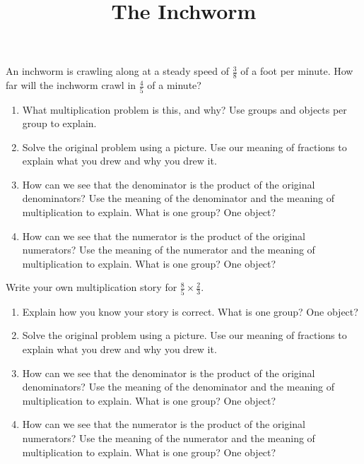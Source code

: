 \documentclass[nooutcomes,noauthor,handout]{ximera}
\title{The Inchworm}
\begin{document}
\begin{abstract}
\end{abstract}

\maketitle


\begin{problem}
An inchworm is crawling along at a steady speed of $\frac{3}{8}$ of a foot per minute. How far will the inchworm crawl in $\frac{4}{5}$ of a minute?

\begin{enumerate}
	\item What multiplication problem is this, and why? Use groups and objects per group to explain.
	\item Solve the original problem using a picture. Use our meaning of fractions to explain what you drew and why you drew it.
	\item How can we see that the denominator is the product of the original denominators? Use the meaning of the denominator and the meaning of multiplication to explain. What is one group? One object?
	\item How can we see that the numerator is the product of the original numerators? Use the meaning of the numerator and the meaning of multiplication to explain. What is one group? One object?
\end{enumerate}
\end{problem}



\begin{problem}
Write your own multiplication story for $\frac{8}{5} \times \frac{2}{3}$.
\begin{enumerate}
	\item Explain how you know your story is correct. What is one group? One object?
	\item Solve the original problem using a picture. Use our meaning of fractions to explain what you drew and why you drew it.
	\item How can we see that the denominator is the product of the original denominators? Use the meaning of the denominator and the meaning of multiplication to explain. What is one group? One object?
	\item How can we see that the numerator is the product of the original numerators? Use the meaning of the numerator and the meaning of multiplication to explain. What is one group? One object?
\end{enumerate}
\end{problem}
\end{document}

